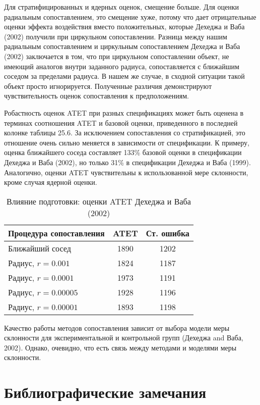 Для стратифицированных и ядерных оценок, смещение больше. Для оценки радиальным сопоставлением, это смещение хуже, потому что дает отрицательные оценки эффекта воздействия вместо положительных, которые Дехеджа и Ваба (2002) получили при циркульном сопоставлении. Разница между нашим радиальным сопоставлением и циркульным сопоставлением Дехеджа и Ваба (2002) заключается в том, что при циркульном сопоставлении объект, не имеющий аналогов внутри заданного радиуса, сопоставляется с ближайшим соседом за пределами радиуса.  В нашем же случае, в сходной ситуации такой объект просто игнорируется. Полученные различия демонстрируют чувствительность оценок сопоставления к предположениям. 

Робастность оценок ATET при разных спецификациях может быть оценена в терминах соотношения ATET и базовой оценки, приведенного в последней колонке таблицы 25.6. За исключением сопоставления со стратификацией, это отношение очень сильно меняется в зависимости от спецификации. К примеру, оценка ближайшего соседа составляет 133\% базовой оценки в спецификации Дехеджа и Ваба (2002), но только 31\% в спецификации Дехеджа и Ваба (1999). Аналогично, оценки ATET чувствительны к использованной мере склонности, кроме случая ядерной оценки. 

\begin{table}[h]
\caption{Влияние подготовки: оценки ATET Дехеджа и Ваба (2002)}
\begin{center}
\begin{tabular}{lcc}
\hline
\hline
Процедура сопоставления & ATET &  Ст. ошибка \\
\hline
Ближайший сосед & 1890 & 1202 \\
Радиус, $r = 0.001$ & 1824 & 1187 \\
Радиус, $r = 0.0001$ & 1973 & 1191 \\
Радиус, $r = 0.00005$ & 1928 & 1196 \\
Радиус, $r = 0.00001$ & 1893 & 1198 \\
\hline
\hline
\end{tabular}
\end{center}
\end{table}

Качество работы методов сопоставления зависит от выбора модели меры склонности для экспериментальной и контрольной групп (Дехеджа and Ваба, 2002). Однако, очевидно, что есть связь между методами и моделями меры склонности. 

\section{Библиографические замечания}

